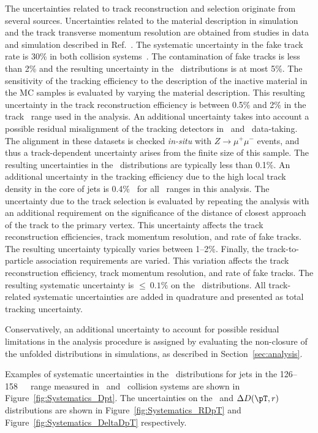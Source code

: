 The uncertainties related to track reconstruction and selection originate from several sources.
Uncertainties related to the material description in simulation and the track transverse 
momentum resolution are obtained from studies in data and simulation described in Ref.~\cite{ATL-PHYS-PUB-2015-051}.
The systematic uncertainty in the fake track rate is 30\% in both collision systems~\cite{ATL-PHYS-PUB-2015-051}.  The contamination of fake tracks is less than 2\% and the resulting uncertainty in the \Dptr\ distributions is at most 5\%.
The sensitivity of the tracking efficiency to the description of the 
inactive material in the MC samples is evaluated by varying the material description.
This resulting uncertainty in the track reconstruction efficiency is between
0.5\% and 2\% in the track \pT\ range used in the analysis. 
An additional uncertainty takes into account a possible residual misalignment of the tracking detectors
in \pp\ and \PbPb\ data-taking. The alignment in these datasets is checked \textit{in-situ} with $Z\rightarrow \mu^{+}\mu^{-}$ events, and thus a track-\pT\-dependent uncertainty arises from the finite size of this sample. The resulting uncertainties in
the \Dptr\ distributions are typically less than 0.1\%. An additional  uncertainty in the tracking efficiency due to the high local track density in the core of jets is 0.4\%~\cite{ATL-PHYS-PUB-2016-007} for all \ptjet\ ranges in this analysis. The uncertainty due to the track selection is evaluated by repeating the analysis with an additional requirement on the significance of the distance of closest approach of the track to the primary vertex. This uncertainty affects 
the track reconstruction efficiencies, track momentum resolution, and rate of fake tracks. The resulting uncertainty typically varies between 1--2\%.
Finally, the track-to-particle association requirements are varied. This variation affects the track reconstruction efficiency, track momentum resolution, and rate of fake tracks. The resulting systematic uncertainty is $\leq~0.1 \%$ on the \Dptr\ distributions. All track-related systematic uncertainties are added in quadrature and presented as total tracking uncertainty. 

Conservatively, an additional uncertainty to account for possible residual limitations in the analysis procedure is assigned by evaluating the non-closure of the unfolded distributions in simulations, as described in Section~\ref{sec:analysis}. 

Examples of systematic uncertainties in the \Dptr\ distributions for jets in the 126--158~\GeV\ \ptjet\ 
range measured in \pp\ and \pbpb\ collision systems are shown in Figure~\ref{fig:Systematics_Dpt}. The uncertainties on the \RDptr\ and  $\Delta\Dptr$ distributions are shown in Figure~\ref{fig:Systematics_RDpT} and Figure~\ref{fig:Systematics_DeltaDpT} respectively.

